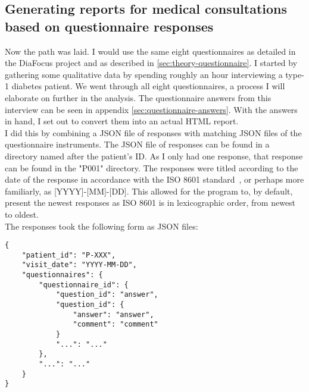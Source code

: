 \subsection{Generating reports for medical consultations based on questionnaire responses}
Now the path was laid. I would use the same eight questionnaires as detailed in the DiaFocus project and as described in \autoref{sec:theory-questionnaire}. I started by gathering some qualitative data by spending roughly an hour interviewing a type-1 diabetes patient. We went through all eight questionnaires, a process I will elaborate on further in the analysis. The questionnaire answers from this interview can be seen in appendix \autoref{sec:questionnaire-answers}. With the answers in hand, I set out to convert them into an actual HTML report.
\\
I did this by combining a JSON file of responses with matching JSON files of the questionnaire instruments. The JSON file of responses can be found in a directory named after the patient's ID. As I only had one response, that response can be found in the "P001" directory. The responses were titled according to the date of the response in accordance with the ISO 8601 standard~\cite{Wiki-ISO-8601}, or perhaps more familiarly, as [YYYY]-[MM]-[DD]. This allowed for the program to, by default, present the newest responses as ISO 8601 is in lexicographic order, from newest to oldest.
\\
The responses took the following form as JSON files:

\begin{verbatim}
{
    "patient_id": "P-XXX",
    "visit_date": "YYYY-MM-DD",
    "questionnaires": {
        "questionnaire_id": {
            "question_id": "answer",
            "question_id": {
                "answer": "answer",
                "comment": "comment"
            }
            "...": "..."
        },
        "...": "..."
    }
}
\end{verbatim}

